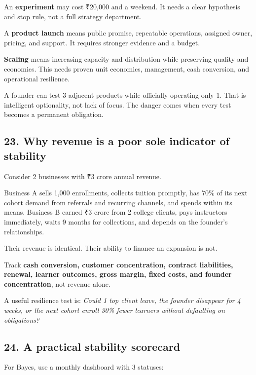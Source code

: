 An \textbf{experiment} may cost \textnormal{₹}20,000 and a weekend. It needs a clear hypothesis and stop rule, not a full strategy department.

A \textbf{product launch} means public promise, repeatable operations, assigned owner, pricing, and support. It requires stronger evidence and a budget.

\textbf{Scaling} means increasing capacity and distribution while preserving quality and economics. This needs proven unit economics, management, cash conversion, and operational resilience.

A founder can test 3 adjacent products while officially operating only 1. That is intelligent optionality, not lack of focus. The danger comes when every test becomes a permanent obligation.

\subsection{23. Why revenue is a poor sole indicator of stability}

Consider 2 businesses with \textnormal{₹}3 crore annual revenue.

Business A sells 1,000 enrollments, collects tuition promptly, has 70\% of its next cohort demand from referrals and recurring channels, and spends within its means. Business B earned \textnormal{₹}3 crore from 2 college clients, pays instructors immediately, waits 9 months for collections, and depends on the founder's relationships.

Their revenue is identical. Their ability to finance an expansion is not.

Track \textbf{cash conversion, customer concentration, contract liabilities, renewal, learner outcomes, gross margin, fixed costs, and founder concentration}, not revenue alone.

A useful resilience test is: \textit{Could 1 top client leave, the founder disappear for 4 weeks, or the next cohort enroll 30\% fewer learners without defaulting on obligations?}

\subsection{24. A practical stability scorecard}

For Bayes, use a monthly dashboard with 3 statuses:


